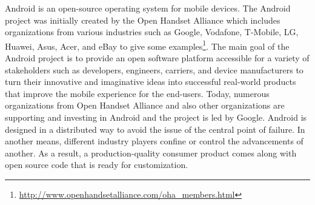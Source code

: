 Android is an open-source operating system for mobile devices. The Android project was initially created by the Open Handset Alliance which includes organizations from various industries such as Google, Vodafone, T-Mobile, LG, Huawei, Asus, Acer, and eBay to give some examples\footnote{\url{http://www.openhandsetalliance.com/oha_members.html}}. The main goal of the Android project is to provide an open software platform accessible for a variety of stakeholders such as developers, engineers, carriers, and device manufacturers to turn their innovative and imaginative ideas into successful real-world products that improve the mobile experience for the end-users. Today, numerous organizations from Open Handset Alliance and also other organizations are supporting and investing in Android and the project is led by Google. Android is designed in a distributed way to avoid the issue of the central point of failure. In another means, different industry players confine or control the advancements of another. As a result, a production-quality consumer product comes along with open source code that is ready for customization.